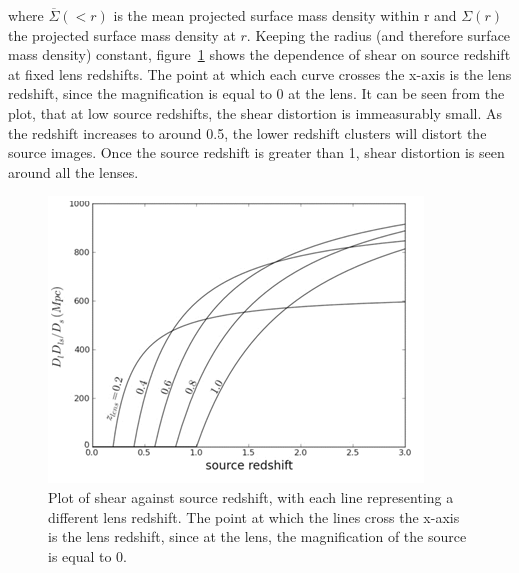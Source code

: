 	where $\overbar{\Sigma}(<r)$ is the mean projected surface mass density within r and $\Sigma(r)$ the projected surface mass density at $r$. Keeping the radius (and therefore surface mass density) constant, figure~\ref{fig:shear_as_a_function_of_source_redshift} shows the dependence of shear on source redshift at fixed lens redshifts. The point at which each curve crosses the x-axis is the lens redshift, since the magnification is equal to 0 at the lens. It can be seen from the plot, that at low source redshifts, the shear distortion is immeasurably small. As the redshift increases to around 0.5, the lower redshift clusters will distort the source images. Once the source redshift is greater than 1, shear distortion is seen around all the lenses\cite{Constraining_source_redshift_distributions}.
	\begin{figure}[ht]
		\centering
			\includegraphics[width=\textwidth]{../Images/Shear_as_a_function_of_source_redshift.png}
		\caption[Shear as a function of source redshift]{\cite{Constraining_source_redshift_distributions}Plot of shear against source redshift, with each line representing a different lens redshift. The point at which the lines cross the x-axis is the lens redshift, since at the lens, the magnification of the source is equal to 0.\label{fig:shear_as_a_function_of_source_redshift}}
	\end{figure}

